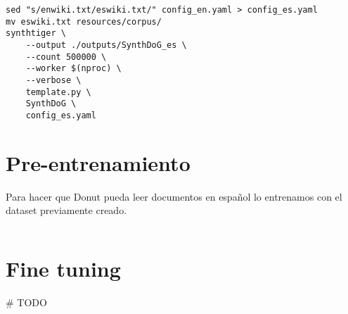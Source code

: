 \documentclass[../main.tex]{subfiles}
\begin{document}
\begin{verbatim}
sed "s/enwiki.txt/eswiki.txt/" config_en.yaml > config_es.yaml
mv eswiki.txt resources/corpus/
synthtiger \
	--output ./outputs/SynthDoG_es \
	--count 500000 \
	--worker $(nproc) \
	--verbose \
	template.py \
	SynthDoG \
	config_es.yaml
\end{verbatim}

\section{Pre-entrenamiento}

Para hacer que Donut pueda leer documentos en español lo entrenamos con el dataset previamente
creado.

\inputminted[bgcolor=codeBack, tabsize=2]{bash}{train.sh}

\section{Fine tuning}

\# TODO
\end{document}
